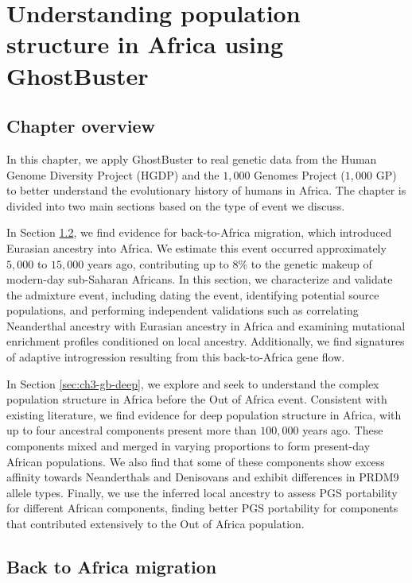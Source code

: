 \chapter{\label{ch:3-gb-result}Understanding population structure in Africa using GhostBuster}

\minitoc

\section{Chapter overview}

In this chapter, we apply GhostBuster to real genetic data from the Human Genome Diversity Project (HGDP) and the $1{,}000$ Genomes Project ($1{,}000$ GP) to better understand the evolutionary history of humans in Africa. The chapter is divided into two main sections based on the type of event we discuss.

In Section \ref{sec:ch3-gb-bta}, we find evidence for back-to-Africa migration, which introduced Eurasian ancestry into Africa. We estimate this event occurred approximately $5{,}000$ to $15{,}000$ years ago, contributing up to 8\% to the genetic makeup of modern-day sub-Saharan Africans. In this section, we characterize and validate the admixture event, including dating the event, identifying potential source populations, and performing independent validations such as correlating Neanderthal ancestry with Eurasian ancestry in Africa and examining mutational enrichment profiles conditioned on local ancestry. Additionally, we find signatures of adaptive introgression resulting from this back-to-Africa gene flow.

In Section \ref{sec:ch3-gb-deep}, we explore and seek to understand the complex population structure in Africa before the Out of Africa event. Consistent with existing literature, we find evidence for deep population structure in Africa, with up to four ancestral components present more than $100{,}000$ years ago. These components mixed and merged in varying proportions to form present-day African populations. We also find that some of these components show excess affinity towards Neanderthals and Denisovans and exhibit differences in PRDM9 allele types. Finally, we use the inferred local ancestry to assess PGS portability for different African components, finding better PGS portability for components that contributed extensively to the Out of Africa population.  

 
\section{Back to Africa migration}
\label{sec:ch3-gb-bta}

